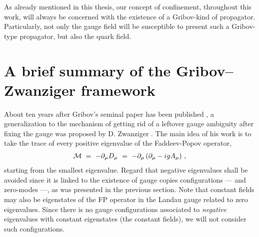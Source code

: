 As already mentioned in this thesis, our concept of confinement, throughout this work, will
always be concerned with the existence of a Gribov-kind of propagator. Particularly, not only
the gauge field will be susceptible to present such a Gribov-type propagator, but also the quark
field.















\section{A brief summary of the Gribov--Zwanziger framework}
\label{gzintro}


About ten years after Gribov's seminal paper has been published
\cite{Gribov:1977wm}, a generalization to the mechanism of getting rid of a leftover gauge
ambiguity after fixing the gauge was proposed by D. Zwanziger \cite{Zwanziger:1988jt}.
The main idea of his work is to take the trace of every positive eigenvalue of the
Faddeev-Popov operator,
\begin{eqnarray}
{\cal M} ~=~ - \partial_{\mu}D_{\mu} ~=~ -\partial_{\mu}\left(\partial_{\mu} -igA_{\mu} \right)\,,
\end{eqnarray}
starting from the smallest eigenvalue. Regard that negative eigenvalues shall be avoided since
it is linked to the existence of gauge copies configurations --- and zero-modes ---, as was
presented in the previous section. Note that constant fields may also be eigenstates of the FP
operator in the Landau gauge related to zero eigenvalues. Since there is no gauge
configurations associated to {\it negative} eigenvalues  with constant eigenstates (the
constant fields), we will not consider such configurations.

